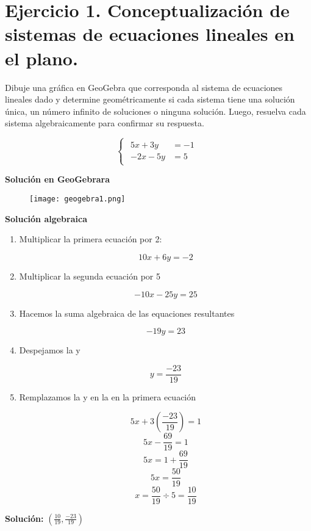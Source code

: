 \section{Ejercicio 1. Conceptualización de sistemas de ecuaciones lineales en el plano.}

Dibuje una gráfica en GeoGebra que corresponda al sistema de ecuaciones lineales dado y determine geométricamente si cada sistema tiene una solución única, un número infinito de soluciones o ninguna solución. Luego, resuelva cada sistema algebraicamente para confirmar su respuesta.

\[
\begin{cases}
    \begin{aligned}
        5x+3y &=-1 \\
        -2x-5y &=5
    \end{aligned}
\end{cases}
\]

\textbf{Solución en GeoGebrara}
\begin{figure}[ht!]
    \texttt{[image: geogebra1.png]}
\end{figure}

\textbf{Solución algebraica}

\begin{enumerate}
    \item Multiplicar la primera ecuación por 2:
    
    \[10x+6y=-2\]

    \item Multiplicar la segunda ecuación por 5
    
    \[-10x-25y=25\]

    \item Hacemos la suma algebraica de las equaciones resultantes
    
    \[-19y=23\]

    \item Despejamos la y
    
    \[y=\frac{-23}{19}\]
    
    \item Remplazamos la y en la en la primera ecuación
    
    \[5x+3\left(\frac{-23}{19}\right)=1\]
    \[5x-\frac{69}{19}=1\]
    \[5x=1+\frac{69}{19}\]
    \[5x=\frac{50}{19}\]
    \[x=\frac{50}{19}\div5=\frac{10}{19}\]
\end{enumerate}

\begin{center}
    \textbf{Solución:} \(\left(\frac{10}{19},\frac{-23}{19}\right)\)
\end{center}
